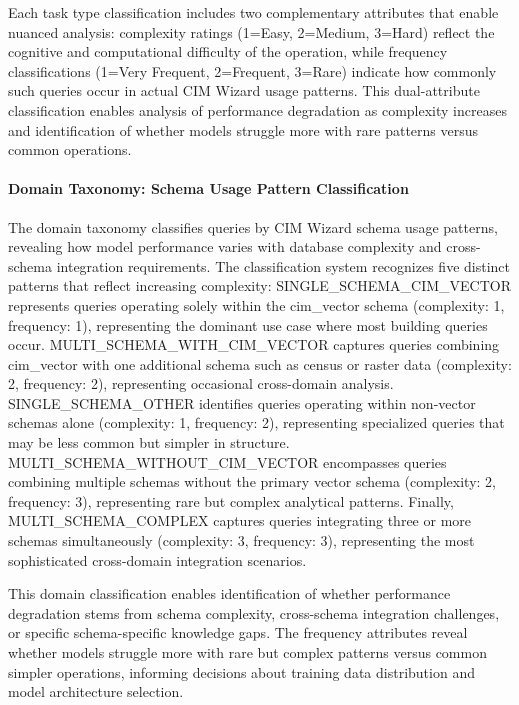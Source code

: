 Each task type classification includes two complementary attributes that enable nuanced analysis: complexity ratings (1=Easy, 2=Medium, 3=Hard) reflect the cognitive and computational difficulty of the operation, while frequency classifications (1=Very Frequent, 2=Frequent, 3=Rare) indicate how commonly such queries occur in actual CIM Wizard usage patterns. This dual-attribute classification enables analysis of performance degradation as complexity increases and identification of whether models struggle more with rare patterns versus common operations.

\paragraph{Domain Taxonomy: Schema Usage Pattern Classification}

The domain taxonomy classifies queries by CIM Wizard schema usage patterns, revealing how model performance varies with database complexity and cross-schema integration requirements. The classification system recognizes five distinct patterns that reflect increasing complexity: SINGLE\_SCHEMA\_CIM\_VECTOR represents queries operating solely within the cim\_vector schema (complexity: 1, frequency: 1), representing the dominant use case where most building queries occur. MULTI\_SCHEMA\_WITH\_CIM\_VECTOR captures queries combining cim\_vector with one additional schema such as census or raster data (complexity: 2, frequency: 2), representing occasional cross-domain analysis. SINGLE\_SCHEMA\_OTHER identifies queries operating within non-vector schemas alone (complexity: 1, frequency: 2), representing specialized queries that may be less common but simpler in structure. MULTI\_SCHEMA\_WITHOUT\_CIM\_VECTOR encompasses queries combining multiple schemas without the primary vector schema (complexity: 2, frequency: 3), representing rare but complex analytical patterns. Finally, MULTI\_SCHEMA\_COMPLEX captures queries integrating three or more schemas simultaneously (complexity: 3, frequency: 3), representing the most sophisticated cross-domain integration scenarios.

This domain classification enables identification of whether performance degradation stems from schema complexity, cross-schema integration challenges, or specific schema-specific knowledge gaps. The frequency attributes reveal whether models struggle more with rare but complex patterns versus common simpler operations, informing decisions about training data distribution and model architecture selection.

